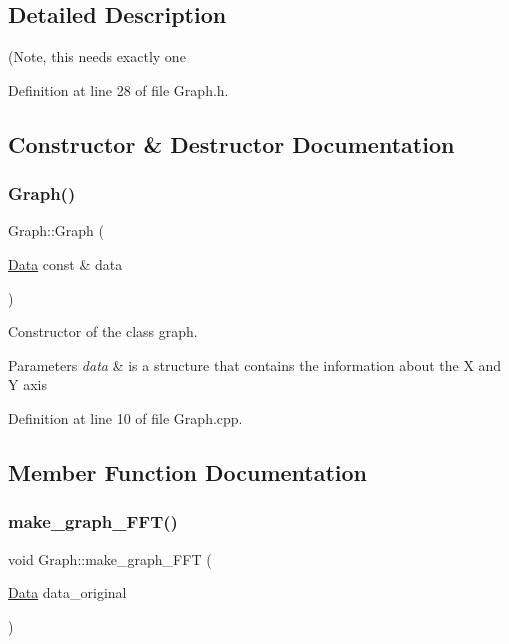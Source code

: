 \subsection{Detailed Description}
(Note, this needs exactly one 

Definition at line 28 of file Graph.\+h.



\subsection{Constructor \& Destructor Documentation}
\mbox{\label{class_graph_ac2cc4f7971589f9674f4fbf3b7dc200c}} 
\subsubsection{\texorpdfstring{Graph()}{Graph()}}
{\footnotesize\ttfamily Graph\+::\+Graph (\begin{DoxyParamCaption}\item[{\mbox{\hyperlink{struct_data}{Data}} const \&}]{data }\end{DoxyParamCaption})\hspace{0.3cm}{\ttfamily [explicit]}}



Constructor of the class graph. 


\begin{DoxyParams}{Parameters}
{\em data} & is a structure that contains the information about the X and Y axis \\
\hline
\end{DoxyParams}


Definition at line 10 of file Graph.\+cpp.



\subsection{Member Function Documentation}
\mbox{\label{class_graph_a5326be30b090c2ba956d0e0211895fcd}} 
\subsubsection{\texorpdfstring{make\+\_\+graph\+\_\+\+F\+F\+T()}{make\_graph\_FFT()}}
{\footnotesize\ttfamily void Graph\+::make\+\_\+graph\+\_\+\+F\+FT (\begin{DoxyParamCaption}\item[{\mbox{\hyperlink{struct_data}{Data}}}]{data\+\_\+original }\end{DoxyParamCaption})}




